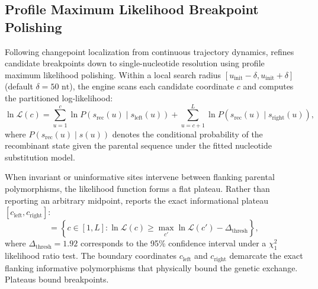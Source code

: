 \subsection{Profile Maximum Likelihood Breakpoint Polishing}
\label{subsec:methods_polisher}

Following changepoint localization from continuous trajectory dynamics, \RhizAeon refines candidate breakpoints down to single-nucleotide resolution using profile maximum likelihood polishing.
Within a local search radius $[u_{\text{init}} - \delta, u_{\text{init}} + \delta]$ (default $\delta = 50\text{ nt}$), the engine scans each candidate coordinate $c$ and computes the partitioned log-likelihood:
\begin{equation}
\ln \mathcal{L}(c) = \sum_{u=1}^c \ln P\left(s_{\text{rec}}(u) \mid s_{\text{left}}(u)\right) + \sum_{u=c+1}^L \ln P\left(s_{\text{rec}}(u) \mid s_{\text{right}}(u)\right),
\label{eq:methods_profile_likelihood}
\end{equation}
where $P(s_{\text{rec}}(u) \mid s(u))$ denotes the conditional probability of the recombinant state given the parental sequence under the fitted nucleotide substitution model.

When invariant or uninformative sites intervene between flanking parental polymorphisms, the likelihood function forms a flat plateau.
Rather than reporting an arbitrary midpoint, \RhizAeon reports the exact informational plateau $[c_{\text{left}}, c_{\text{right}}]$:
\begin{equation}
[c_{\text{left}}, c_{\text{right}}] = \left\{ c \in [1, L] : \ln \mathcal{L}(c) \ge \max_{c'} \ln \mathcal{L}(c') - \Delta_{\text{thresh}} \right\},
\label{eq:methods_info_plateau}
\end{equation}
where $\Delta_{\text{thresh}} = 1.92$ corresponds to the 95\% confidence interval under a $\chi_1^2$ likelihood ratio test.
The boundary coordinates $c_{\text{left}}$ and $c_{\text{right}}$ demarcate the exact flanking informative polymorphisms that physically bound the genetic exchange.
Plateaus bound breakpoints.

